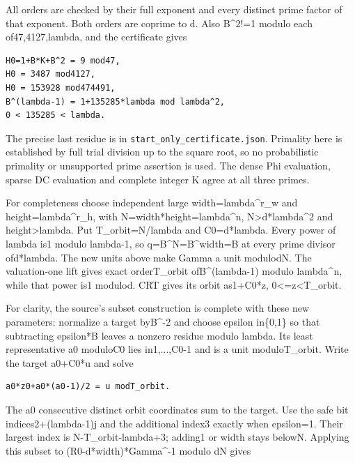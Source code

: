 All orders are checked by their full exponent and every distinct prime factor of that exponent. Both orders are coprime to d. Also B\textasciicircum{}2!=1 modulo each of47,4127,lambda, and the certificate gives

\begin{Verbatim}[fontsize=\small,breaklines=true,breakanywhere=true,breaksymbolleft={}]
H0=1+B*K+B^2 = 9 mod47,
H0 = 3487 mod4127,
H0 = 153928 mod474491,
B^(lambda-1) = 1+135285*lambda mod lambda^2,
0 < 135285 < lambda.
\end{Verbatim}

The precise last residue is in \texttt{start\_only\_certificate.json}. Primality here is established by full trial division up to the square root, so no probabilistic primality or unsupported prime assertion is used. The dense Phi evaluation, sparse DC evaluation and complete integer K agree at all three primes.

For completeness choose independent large width=lambda\textasciicircum{}r\_w and height=lambda\textasciicircum{}r\_h, with N=width*height=lambda\textasciicircum{}n, N>d*lambda\textasciicircum{}2 and height>lambda. Put T\_orbit=N/lambda and C0=d*lambda. Every power of lambda is1 modulo lambda-1, so q=B\textasciicircum{}N=B\textasciicircum{}width=B at every prime divisor ofd*lambda. The new units above make Gamma a unit modulodN. The valuation-one lift gives exact orderT\_orbit ofB\textasciicircum{}(lambda-1) modulo lambda\textasciicircum{}n, while that power is1 modulod. CRT gives its orbit as1+C0*z, 0<=z<T\_orbit.

For clarity, the source's subset construction is complete with these new parameters: normalize a target byB\textasciicircum{}-2 and choose epsilon in\{0,1\} so that subtracting epsilon*B leaves a nonzero residue modulo lambda. Its least representative a0 moduloC0 lies in1,...,C0-1 and is a unit moduloT\_orbit. Write the target a0+C0*u and solve

\begin{Verbatim}[fontsize=\small,breaklines=true,breakanywhere=true,breaksymbolleft={}]
a0*z0+a0*(a0-1)/2 = u modT_orbit.
\end{Verbatim}

The a0 consecutive distinct orbit coordinates sum to the target. Use the safe bit indices2+(lambda-1)j and the additional index3 exactly when epsilon=1. Their largest index is N-T\_orbit-lambda+3; adding1 or width stays belowN. Applying this subset to (R0-d*width)*Gamma\textasciicircum{}-1 modulo dN gives

